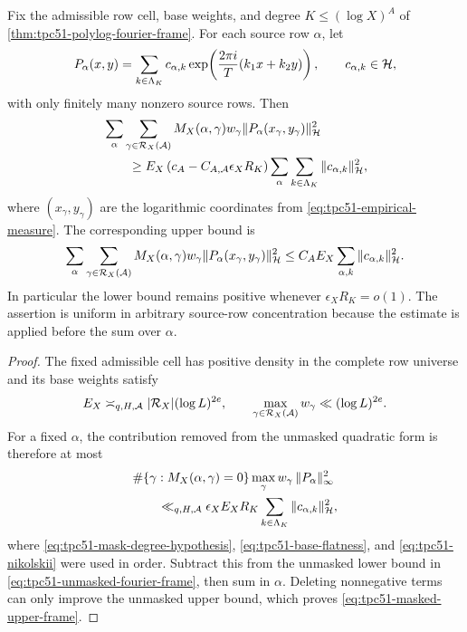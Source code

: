 \begin{theorem}
\label{thm:tpc51-masked-frame}
Fix the admissible row cell, base weights, and degree
\(K\leq(\log X)^A\) of \cref{thm:tpc51-polylog-fourier-frame}.  For
each source row \(\alpha\), let
\begin{equation}
 P_\alpha(x,y)=\sum_{k\in\Lambda_K}
 c_{\alpha,k}
 \exp\!\left(\frac{2\pi i}{T}(k_1x+k_2y)\right),
 \qquad c_{\alpha,k}\in\mathcal H,
 \label{eq:tpc51-row-dependent-polynomial}
\end{equation}
with only finitely many nonzero source rows.  Then
\begin{align}
 &\sum_\alpha\sum_{\gamma\in\mathcal R_X(\mathcal A)}
 M_X(\alpha,\gamma)w_\gamma
 \|P_\alpha(x_\gamma,y_\gamma)\|_{\mathcal H}^2
 \notag\\
 &\qquad\geq E_X
 \left(c_A-C_{A,\mathcal A}\epsilon_XR_K\right)
 \sum_\alpha\sum_{k\in\Lambda_K}\|c_{\alpha,k}\|_{\mathcal H}^2,
 \label{eq:tpc51-masked-lower-frame}
\end{align}
where \((x_\gamma,y_\gamma)\) are the logarithmic coordinates from
\eqref{eq:tpc51-empirical-measure}.  The corresponding upper bound is
\begin{equation}
 \sum_\alpha\sum_{\gamma\in\mathcal R_X(\mathcal A)}
 M_X(\alpha,\gamma)w_\gamma
 \|P_\alpha(x_\gamma,y_\gamma)\|_{\mathcal H}^2
 \leq C_AE_X\sum_{\alpha,k}\|c_{\alpha,k}\|_{\mathcal H}^2.
 \label{eq:tpc51-masked-upper-frame}
\end{equation}
In particular the lower bound remains positive whenever
\(\epsilon_XR_K=o(1)\).  The assertion is uniform in arbitrary
source-row concentration because the estimate is applied before the
sum over \(\alpha\).
\end{theorem}

\begin{proof}
The fixed admissible cell has positive density in the complete row
universe and its base weights satisfy
\begin{equation}
 E_X\asymp_{q,H,\mathcal A}|\mathcal R_X|(\log L)^{2e},
 \qquad
 \max_{\gamma\in\mathcal R_X(\mathcal A)}w_\gamma
 \ll(\log L)^{2e}.
 \label{eq:tpc51-base-flatness}
\end{equation}
For a fixed \(\alpha\), the contribution removed from the unmasked
quadratic form is therefore at most
\begin{align}
 &\#\{\gamma:M_X(\alpha,\gamma)=0\}
 \max_\gamma w_\gamma\,
 \|P_\alpha\|_\infty^2
 \notag\\
 &\qquad\ll_{q,H,\mathcal A}
 \epsilon_XE_XR_K
 \sum_{k\in\Lambda_K}\|c_{\alpha,k}\|_{\mathcal H}^2,
 \label{eq:tpc51-deleted-bank-energy}
\end{align}
where \eqref{eq:tpc51-mask-degree-hypothesis},
\eqref{eq:tpc51-base-flatness}, and \eqref{eq:tpc51-nikolskii} were
used in order.  Subtract this from the unmasked lower bound in
\eqref{eq:tpc51-unmasked-fourier-frame}, then sum in \(\alpha\).
Deleting nonnegative terms can only improve the unmasked upper bound,
which proves \eqref{eq:tpc51-masked-upper-frame}.
\end{proof}

